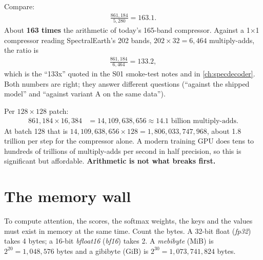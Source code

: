 Compare:
\begin{align*}
  \frac{861{,}184}{5{,}280} = 163.1 .
\end{align*}
About \textbf{163 times} the arithmetic of today's 165-band compressor. Against a 1$\times$1 compressor reading SpectralEarth's 202 bands, $202\times32 = 6{,}464$ multiply-adds, the ratio is
\begin{align*}
  \frac{861{,}184}{6{,}464} = 133.2,
\end{align*}
which is the ``133x'' quoted in the S01 smoke-test notes and in \cref{ch:specdecoder}. Both numbers are right; they answer different questions (``against the shipped model'' and ``against variant A on the same data'').

Per $128\times128$ patch:
\begin{align*}
  861{,}184\times16{,}384 &= 14{,}109{,}638{,}656 \approx 14.1 \text{ billion multiply-adds.}
\end{align*}
At batch 128 that is $14{,}109{,}638{,}656\times128 = 1{,}806{,}033{,}747{,}968$, about 1.8 trillion per step for the compressor alone\tagC. A modern training GPU does tens to hundreds of trillions of multiply-adds per second in half precision, so this is significant but affordable. \textbf{Arithmetic is not what breaks first.}

\section{The memory wall}\label{sec:crossstem:memory}

To compute attention, the scores, the softmax weights, the keys and the values must exist in memory at the same time. Count the bytes. A 32-bit float (\emph{fp32}) takes 4 bytes; a 16-bit \emph{bfloat16} (\emph{bf16}) takes 2. A \emph{mebibyte} (MiB) is $2^{20} = 1{,}048{,}576$ bytes and a gibibyte (GiB) is $2^{30} = 1{,}073{,}741{,}824$ bytes.

